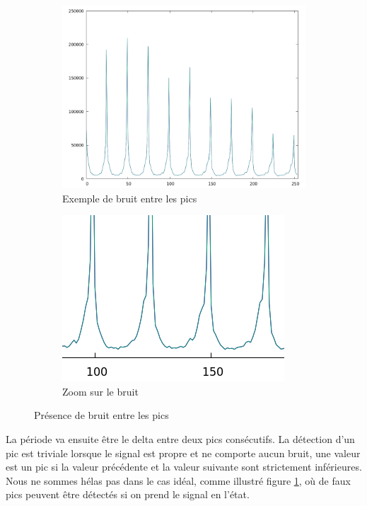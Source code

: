 \documentclass[utf8,final]{stageM2R} %
\begin{document}
\begin{figure}
  \begin{subfigure}{.5\textwidth}
    \centering
    \includegraphics[width=\linewidth]{images/signal_noise}
    \caption{Exemple de bruit entre les pics}
  \end{subfigure}
  \begin{subfigure}{.5\textwidth}
    \centering
    \includegraphics[width=\linewidth]{images/signal_noise_zoom}
    \caption{Zoom sur le bruit}
  \end{subfigure}
  \caption{Présence de bruit entre les pics}
  \label{fig:signal_noise}
\end{figure}

La période va ensuite être le delta entre deux pics consécutifs. La détection d'un pic est triviale lorsque le signal est propre et ne comporte aucun bruit, une valeur est un pic si la valeur précédente et la valeur suivante sont strictement inférieures. Nous ne sommes hélas pas dans le cas idéal, comme illustré figure \ref{fig:signal_noise}, où de faux pics peuvent être détectés si on prend le signal en l'état.
\end{document}
